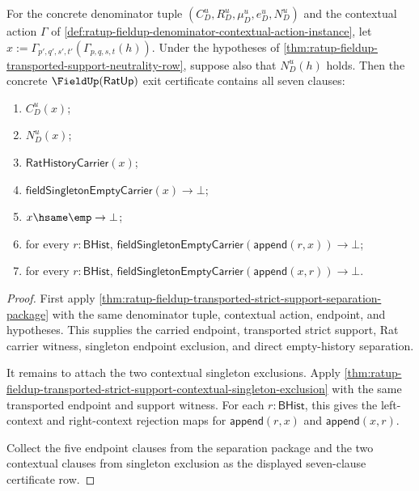 \begin{theorem}
\label{thm:ratup-fieldup-transported-strict-support-contextual-separation-package}
For the concrete denominator tuple $(C_D^u,R_D^u,\mu_D^u,e_D^u,N_D^u)$ and the
contextual action $\Gamma$ of
\autoref{def:ratup-fieldup-denominator-contextual-action-instance}, let
$x:=\Gamma_{p',q',s',t'}(\Gamma_{p,q,s,t}(h))$. Under the hypotheses of
\autoref{thm:ratup-fieldup-transported-support-neutrality-row}, suppose also
that $N_D^u(h)$ holds. Then the concrete $\FieldUp(\mathsf{RatUp})$ exit
certificate contains all seven clauses:
\begin{enumerate}
  \item $C_D^u(x)$;
  \item $N_D^u(x)$;
  \item $\mathsf{RatHistoryCarrier}(x)$;
  \item $\mathsf{fieldSingletonEmptyCarrier}(x)\to\bot$;
  \item $x\hsame\emp\to\bot$;
  \item for every $r:\mathsf{BHist}$,
  $\mathsf{fieldSingletonEmptyCarrier}(\mathsf{append}(r,x))\to\bot$;
  \item for every $r:\mathsf{BHist}$,
  $\mathsf{fieldSingletonEmptyCarrier}(\mathsf{append}(x,r))\to\bot$.
\end{enumerate}
\end{theorem}
\begin{proof}
First apply
\autoref{thm:ratup-fieldup-transported-strict-support-separation-package} with
the same denominator tuple, contextual action, endpoint, and hypotheses. This
supplies the carried endpoint, transported strict support, Rat carrier witness,
singleton endpoint exclusion, and direct empty-history separation.

It remains to attach the two contextual singleton exclusions. Apply
\autoref{thm:ratup-fieldup-transported-strict-support-contextual-singleton-exclusion}
with the same transported endpoint and support witness. For each
$r:\mathsf{BHist}$, this gives the left-context and right-context rejection maps
for $\mathsf{append}(r,x)$ and $\mathsf{append}(x,r)$.

Collect the five endpoint clauses from the separation package and the two
contextual clauses from singleton exclusion as the displayed seven-clause
certificate row.
\end{proof}

